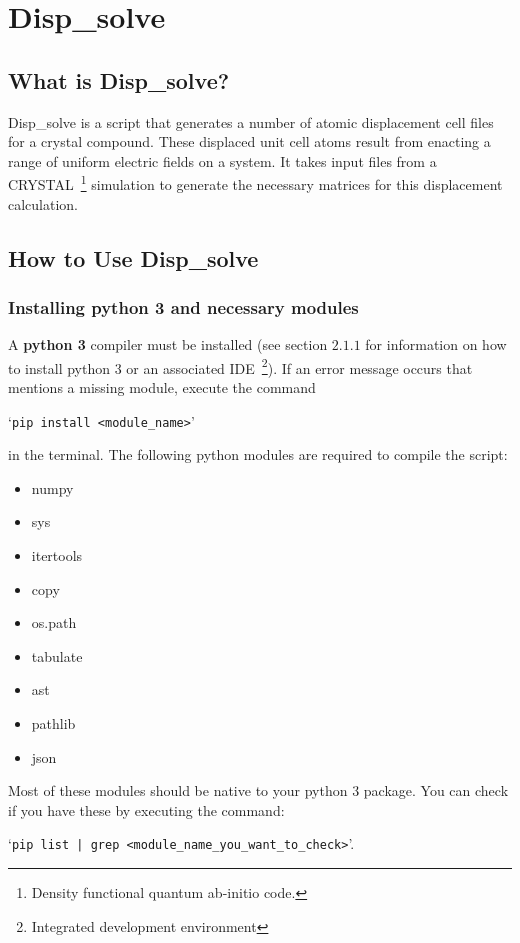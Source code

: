 \section{Disp\_solve}
\subsection{What is Disp\_solve?}
Disp\_solve is a script that generates a number of atomic displacement cell
files for a crystal compound. These displaced unit cell atoms result from
enacting a range of uniform electric fields on a system. It takes input files
from a CRYSTAL~\footnote{Density functional quantum ab-initio code.}
simulation to generate the necessary matrices for this displacement
calculation.

\subsection{How to Use Disp\_solve}
\subsubsection{Installing python 3 and necessary modules}
A \textbf{python 3} compiler must be installed (see section $2.1.1$ for
information on how to install python 3 or an associated IDE~\footnote{Integrated development environment}). If an error message occurs that
mentions a missing module, execute the command

`\texttt{pip install <module\_name>}'

in the terminal. The following python modules are required to compile
the script:
  \begin{itemize} \itemsep -0.5ex
 	\item numpy
 	\item sys
 	\item itertools
 	\item copy
 	\item os.path
 	\item tabulate
 	\item ast
 	\item pathlib
 	\item json
 \end{itemize}

Most of these modules should be native to your python 3 package. You can check if you have these by executing the command:

`\texttt{pip list | grep <module\_name\_you\_want\_to\_check>}'.


